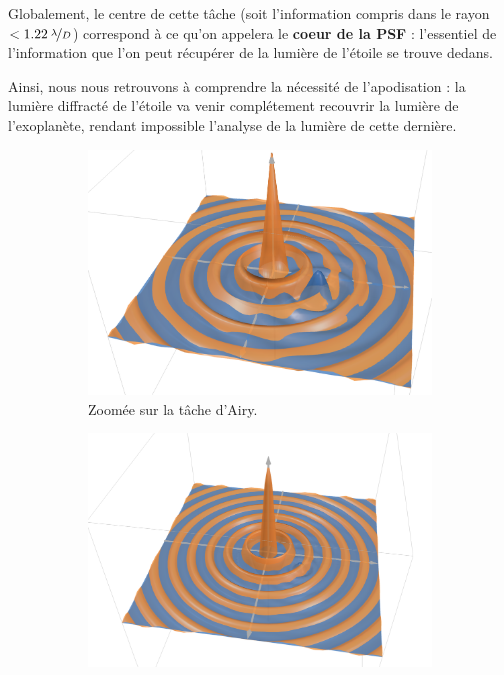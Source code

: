 Globalement, le centre de cette tâche (soit l'information compris dans le rayon $< 1.22\: \nicefrac{\lambda}{D}$) correspond à ce qu'on appelera le \textbf{coeur de la PSF} : l'essentiel de l'information que l'on peut récupérer de la lumière de l'étoile se trouve dedans.


Ainsi, nous nous retrouvons à comprendre la nécessité de l'apodisation : la lumière diffracté de l'étoile va venir complétement recouvrir la lumière de l'exoplanète, rendant impossible l'analyse de la lumière de cette dernière. 


\begin{figure}[htbp]
    \centering
    \begin{subfigure}[b]{0.45\textwidth}
        \centering
        \includegraphics[width=\textwidth]{figures/st_pl_sgn.png}
        \caption{Zoomée sur la tâche d'Airy.}
    \end{subfigure}
    \hfill
    \begin{subfigure}[b]{0.45\textwidth}
        \centering
        \includegraphics[width=\textwidth]{figures/larg_st_pl_sgn.png}

\end{subfigure}
\end{figure}
